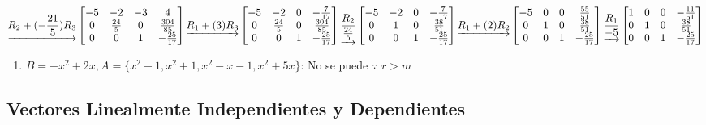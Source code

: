 \documentclass[
  11,
]{article}
\providecommand{\tightlist}{%
  \setlength{\itemsep}{0pt}\setlength{\parskip}{0pt}}
\begin{document}
\[\underrightarrow{ R_2 + (- \frac{21}{5})R_3 }
\left[\begin{matrix}-5 & -2 & -3 & 4\\0 & \frac{24}{5} & 0 & \frac{304}{85}\\0 & 0 & 1 & - \frac{25}{17}\end{matrix}\right]
\underrightarrow{ R_1 + (3)R_3 }
\\
\left[\begin{matrix}-5 & -2 & 0 & - \frac{7}{17}\\0 & \frac{24}{5} & 0 & \frac{304}{85}\\0 & 0 & 1 & - \frac{25}{17}\end{matrix}\right]
\underrightarrow{ \frac{R_2}{\frac{24}{5}} }
\left[\begin{matrix}-5 & -2 & 0 & - \frac{7}{17}\\0 & 1 & 0 & \frac{38}{51}\\0 & 0 & 1 & - \frac{25}{17}\end{matrix}\right]
\underrightarrow{ R_1 + (2)R_2 }
\\
\left[\begin{matrix}-5 & 0 & 0 & \frac{55}{51}\\0 & 1 & 0 & \frac{38}{51}\\0 & 0 & 1 & - \frac{25}{17}\end{matrix}\right]
\underrightarrow{ \frac{R_1}{-5} }
\left[\begin{matrix}1 & 0 & 0 & - \frac{11}{51}\\0 & 1 & 0 & \frac{38}{51}\\0 & 0 & 1 & - \frac{25}{17}\end{matrix}\right]
  \]

\begin{enumerate}
\def\labelenumi{\alph{enumi})}
\setcounter{enumi}{1}
\tightlist
\item
  \(B = -x^2+2x, A = \{x^2-1, x^2+1, x^2-x-1, x^2+5x\}\): No se puede
  \(\because\) \(r > m\)
\end{enumerate}

\hypertarget{vectores-linealmente-independientes-y-dependientes}{%
\subsection{Vectores Linealmente Independientes y
Dependientes}\label{vectores-linealmente-independientes-y-dependientes}}
\end{document}
